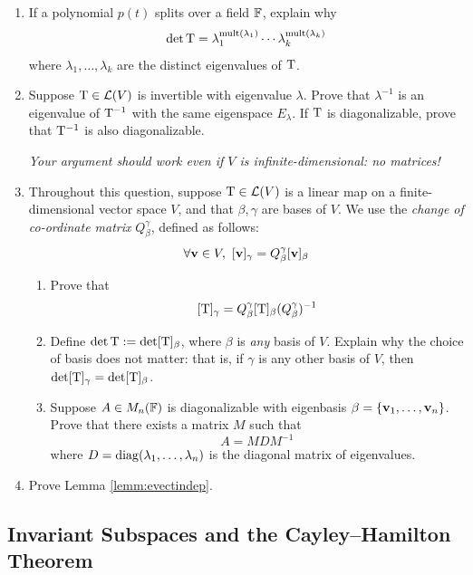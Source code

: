 \begin{exercises}
\begin{enumerate}
	  
	  \item If a polynomial $p(t)$ splits over a field $\mathbb{F}$, explain why
	  \[
	  	\det \mathrm{T}=\lambda_1^{\operatorname{mult}(\lambda_1)}\cdots\lambda_k^{\operatorname{mult}(\lambda_k)}
	  \]
	  where $\lambda_1,\ldots,\lambda_k$ are the distinct eigenvalues of $\mathrm{T}$.
	  
	  
	  \item Suppose $\mathrm{T}\in\mathcal{L}(V)$ is invertible with eigenvalue $\lambda$. Prove that $\lambda^{-1}$ is an eigenvalue of $\mathrm{T}^{-1}$ with the same eigenspace $E_\lambda$. If $\mathrm{T}$ is diagonalizable, prove that $\mathrm{T}^{-1}$ is also diagonalizable.\par
	  \emph{Your argument should work even if $V$ is infinite-dimensional: no matrices!}
	  	
	  	
	  \item\label{exs:detTbasis} Throughout this question, suppose $\mathrm{T}\in\mathcal{L}(V)$ is a linear map on a finite-dimensional vector space $V$, and that $\beta,\gamma$ are bases of $V$. We use the \emph{change of co-ordinate matrix} $Q_\beta^\gamma$, defined as follows:
	  \[
	  	\forall \vv\in V,\ [\vv]_\gamma=Q_\beta^\gamma[\vv]_\beta
	  \]
	  \begin{enumerate}
	    \item Prove that
	  	\[
	  		[\mathrm{T}]_\gamma=Q_\beta^\gamma [\mathrm{T}]_\beta (Q_\beta^\gamma)^{-1}
	  	\]
	  	\item Define $\det\mathrm{T}:=\det[\mathrm{T}]_\beta$, where $\beta$ is \emph{any} basis of $V$. Explain why the choice of basis does not matter: that is, if $\gamma$ is any other basis of $V$, then $\det[\mathrm{T}]_\gamma=\det[\mathrm{T}]_\beta$.
	  	\item Suppose $A\in M_n(\mathbb{F})$ is diagonalizable with eigenbasis $\beta=\{{\mathbf{v}}_1,\ldots,{\mathbf{v}}_{n}\}$. Prove that there exists a matrix $M$ such that
	  	\[
	  		A=MDM^{-1}
	  	\]
	  	where $D=\operatorname{diag}(\lambda_1,\ldots,\lambda_n)$ is the diagonal matrix of eigenvalues.
	  \end{enumerate}
	  
	  
	  \item Prove Lemma \ref{lemm:evectindep}.
	\end{enumerate}
\end{exercises}


\clearpage





\subsection{Invariant Subspaces and the Cayley--Hamilton Theorem}

